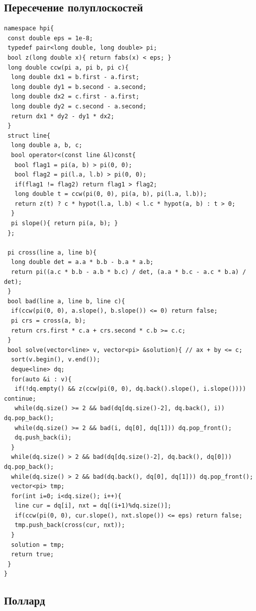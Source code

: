\documentclass[10pt, portrait,letterpaper]{article}
\begin{document}
\subsection{Пересечение полуплоскостей}
\begin{verbatim}
namespace hpi{
 const double eps = 1e-8;
 typedef pair<long double, long double> pi;
 bool z(long double x){ return fabs(x) < eps; }
 long double ccw(pi a, pi b, pi c){
  long double dx1 = b.first - a.first;
  long double dy1 = b.second - a.second;
  long double dx2 = c.first - a.first;
  long double dy2 = c.second - a.second;
  return dx1 * dy2 - dy1 * dx2;
 }
 struct line{
  long double a, b, c;
  bool operator<(const line &l)const{
   bool flag1 = pi(a, b) > pi(0, 0);
   bool flag2 = pi(l.a, l.b) > pi(0, 0);
   if(flag1 != flag2) return flag1 > flag2;
   long double t = ccw(pi(0, 0), pi(a, b), pi(l.a, l.b));
   return z(t) ? c * hypot(l.a, l.b) < l.c * hypot(a, b) : t > 0;
  }
  pi slope(){ return pi(a, b); }
 };
 
 pi cross(line a, line b){
  long double det = a.a * b.b - b.a * a.b;
  return pi((a.c * b.b - a.b * b.c) / det, (a.a * b.c - a.c * b.a) / det);
 }
 bool bad(line a, line b, line c){
  if(ccw(pi(0, 0), a.slope(), b.slope()) <= 0) return false;
  pi crs = cross(a, b);
  return crs.first * c.a + crs.second * c.b >= c.c;
 }
 bool solve(vector<line> v, vector<pi> &solution){ // ax + by <= c;
  sort(v.begin(), v.end());
  deque<line> dq;
  for(auto &i : v){
   if(!dq.empty() && z(ccw(pi(0, 0), dq.back().slope(), i.slope()))) continue;
   while(dq.size() >= 2 && bad(dq[dq.size()-2], dq.back(), i)) dq.pop_back();
   while(dq.size() >= 2 && bad(i, dq[0], dq[1])) dq.pop_front();
   dq.push_back(i);
  }
  while(dq.size() > 2 && bad(dq[dq.size()-2], dq.back(), dq[0])) dq.pop_back();
  while(dq.size() > 2 && bad(dq.back(), dq[0], dq[1])) dq.pop_front();
  vector<pi> tmp;
  for(int i=0; i<dq.size(); i++){
   line cur = dq[i], nxt = dq[(i+1)%dq.size()];
   if(ccw(pi(0, 0), cur.slope(), nxt.slope()) <= eps) return false;
   tmp.push_back(cross(cur, nxt));
  }
  solution = tmp;
  return true;
 }
}
\end{verbatim}

\twocolumn

\subsection{Поллард}
\end{document}
